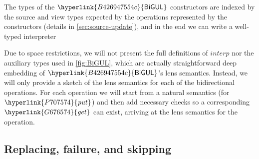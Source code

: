 \documentclass[fleqn]{llncs}
\def\resethooks{%
  \global\let\SaveRestoreHook\empty
  \global\let\ColumnHook\empty}
\let\hspre\empty
\let\hspost\empty
\newcommand{\identifier}[1]{\mathit{#1}}
\newcommand{\constructor}[1]{\mathsf{#1}}
\begin{document}
The types of the \ensuremath{\protect\hyperlink{B426947554c}{\constructor{BiGUL}}} constructors are indexed by the source and view types expected by the operations represented by the constructors (details in \autoref{sec:source-update}), and in the end we can write a well-typed interpreter
\resethooks
Due to space restrictions, we will not present the full definitions of \ensuremath{\identifier{interp}} nor the auxiliary types used in \autoref{fig:BiGUL}, which are actually straightforward deep embedding of \ensuremath{\protect\hyperlink{B426947554c}{\constructor{BiGUL}}}'s lens semantics.
Instead, we will only provide a sketch of the lens semantics for each of the bidirectional operations.
For each operation we will start from a natural semantics (for \ensuremath{\protect\hyperlink{P707574}{\identifier{put}}}) and then add necessary checks so a corresponding \ensuremath{\protect\hyperlink{G676574}{\identifier{get}}} can exist, arriving at the lens semantics for the operation.

\subsection{Replacing, failure, and skipping}
\label{sec:basic-lenses}
\end{document}
